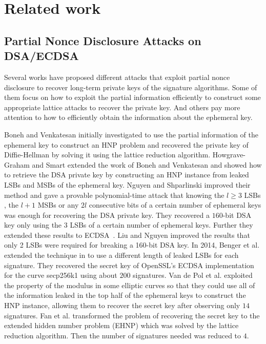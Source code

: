 \section{Related work}
\label{sec:relatedwork}
\subsection{Partial Nonce Disclosure Attacks on DSA/ECDSA}
Several works have proposed different attacks that exploit partial nonce disclosure to recover long-term private keys of the signature algorithms.
Some of them focus on how to exploit the partial information efficiently to construct some appropriate lattice attacks to recover the private key.
 And others pay more attention to how to efficiently obtain the information about the ephemeral key.

Boneh and Venkatesan \cite{boneh1996} initially investigated to use the partial information of the ephemeral key to construct an HNP problem and recovered the private key of Diffie-Hellman by solving it using the lattice reduction algorithm.
Howgrave-Graham and Smart \cite{HG2001} extended the work of Boneh and Venkatesan \cite{boneh1996} and  showed how to retrieve the DSA private key by  constructing an HNP instance from leaked LSBs and MSBs of the ephemeral key.
Nguyen and Shparlinski \cite{Nguyen2002} improved their method  and gave a provable polynomial-time attack that
      knowing the $l \geq 3$ LSBs , the $l+1$ MSBs  or any $2l$ consecutive bits of a certain number of ephemeral keys was enough for recovering the DSA private key.
 They recovered  a $160$-bit DSA key only using the $3$ LSBs of a certain number of ephemeral keys.
 Further they extended these results to ECDSA~\cite{Nguyen2003}.
Liu and Nguyen \cite{Liu2013} improved the results that only 2 LSBs were required for breaking a 160-bit DSA key.
In 2014, Benger et al. \cite{Benger2014} extended the technique in \cite{Nguyen2002} to use a different length of leaked LSBs for each signature.
 They recovered the secret key of OpenSSL's ECDSA implementation for the curve secp256k1 using about $200$ signatures.
Van de Pol et al. \cite{Van2015} exploited the property of the modulus in some elliptic curves so that they could use all of the information leaked in the top half of the ephemeral keys to construct the HNP instance, allowing them to recover the secret key after observing only $14$ signatures.
Fan et al. \cite{Fan2016} transformed the problem of recovering the secret key to the extended hidden number problem (EHNP)
  which was solved by the lattice reduction algorithm.
   Then the number of signatures needed was reduced to $4$.

